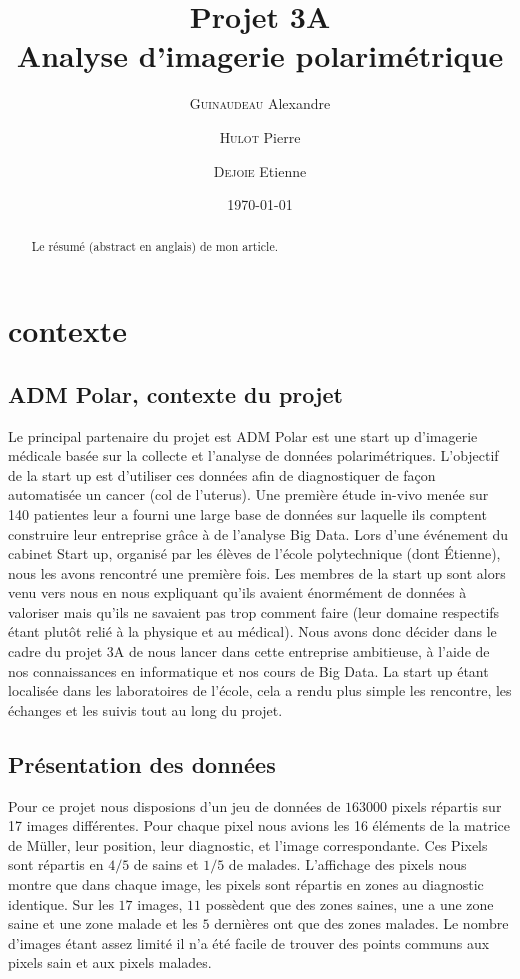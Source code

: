 \documentclass[a4paper,10pt]{report}
\title{Projet 3A\\Analyse d'imagerie polarimétrique}
\author{\textsc{Guinaudeau} Alexandre\\
	\and 
	\textsc{Hulot} Pierre
	\and 
	\textsc{Dejoie} Etienne	
	}
\date{\today}
\begin{document}
\maketitle

\begin{abstract}
Le résumé (abstract en anglais) de mon article.
\end{abstract}

\chapter{contexte}
\section{ADM Polar, contexte du projet}
Le principal partenaire du projet est ADM Polar est une start up d'imagerie médicale basée sur la collecte et l'analyse de données polarimétriques. L'objectif de la start up est d'utiliser ces données afin de diagnostiquer de façon automatisée un cancer (col de l'uterus). Une première étude in-vivo menée sur 140 patientes leur a fourni une large base de données sur laquelle ils comptent construire leur entreprise grâce à de l'analyse Big Data. Lors d'une événement du cabinet Start up, organisé par les élèves de l'école polytechnique (dont Étienne), nous les avons rencontré une première fois. Les membres de la start up sont alors venu vers nous en nous expliquant qu'ils avaient énormément de données à valoriser mais qu'ils ne savaient pas trop comment faire (leur domaine respectifs étant plutôt relié à la physique et au médical). Nous avons donc décider dans le cadre du projet 3A de nous lancer dans cette entreprise ambitieuse, à l'aide de nos connaissances en informatique et nos cours de Big Data. La start up étant localisée dans les laboratoires de l'école, cela a rendu plus simple les rencontre, les échanges et les suivis tout au long du projet.
\section{Présentation des données}
Pour ce projet nous disposions d'un jeu de données de $163 000$ pixels répartis sur 17 images différentes. Pour chaque pixel nous avions les 16 éléments de la matrice de Müller, leur position, leur diagnostic, et l'image correspondante.
Ces Pixels sont répartis en $4/5$ de sains et $1/5$ de malades. L'affichage des pixels nous montre que dans chaque image, les pixels sont répartis en zones au diagnostic identique. Sur les $17$ images, $11$ possèdent que des zones saines, une a une zone saine et une zone malade et les $5$ dernières ont que des zones malades. Le nombre d'images étant assez limité il n'a été facile de trouver des points communs aux pixels sain et aux pixels malades.
\end{document}
